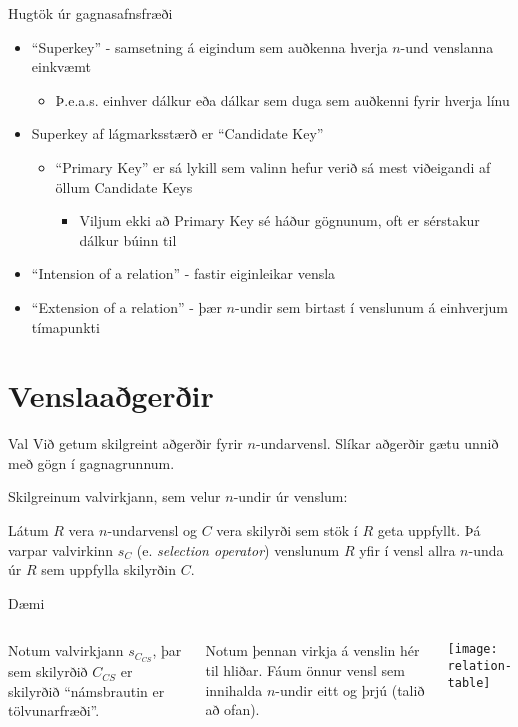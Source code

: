 \documentclass{beamer}
\begin{document}
\begin{frame}{Hugtök úr gagnasafnsfræði}
\begin{itemize}
 \item ``Superkey'' - samsetning á eigindum sem auðkenna hverja $n$-und venslanna einkvæmt
 \begin{itemize}
  \item Þ.e.a.s. einhver dálkur eða dálkar sem duga sem auðkenni fyrir hverja línu
 \end{itemize}
 \item Superkey af lágmarksstærð er ``Candidate Key''
 \begin{itemize}
  \item ``Primary Key'' er sá lykill sem valinn hefur verið sá mest viðeigandi af öllum Candidate Keys
  \begin{itemize}
   \item Viljum ekki að Primary Key sé háður gögnunum, oft er sérstakur dálkur búinn til
  \end{itemize}
 \end{itemize}
 \item ``Intension of a relation'' - fastir eiginleikar vensla
 \item ``Extension of a relation'' - þær $n$-undir sem birtast í venslunum á einhverjum tímapunkti
\end{itemize}
\end{frame}

\section{Venslaaðgerðir}

\begin{frame}{Val}
Við getum skilgreint aðgerðir fyrir $n$-undarvensl. Slíkar aðgerðir gætu unnið með gögn í gagnagrunnum.

\vspace{0.5cm}
Skilgreinum valvirkjann, sem velur $n$-undir úr venslum: 
\begin{tcolorbox}[title=Valvirkinn]
Látum $R$ vera $n$-undarvensl og $C$ vera skilyrði sem stök í $R$ geta uppfyllt. Þá varpar valvirkinn $s_C$ (e. \emph{selection operator}) venslunum $R$ yfir í vensl allra $n$-unda úr $R$ sem uppfylla skilyrðin $C$.
\end{tcolorbox}
\end{frame}

\begin{frame}{Dæmi}
\begin{columns}
Notum valvirkjann $s_{C_{CS}}$, þar sem skilyrðið $C_{CS}$ er skilyrðið ``námsbrautin er tölvunarfræði''.
\vspace{0.5cm}

Notum þennan virkja á venslin hér til hliðar. Fáum önnur vensl sem innihalda $n$-undir eitt og þrjú (talið að ofan).
\begin{center}
\texttt{[image: relation-table]}
\end{center}
\end{columns}
\end{frame}
\end{document}
